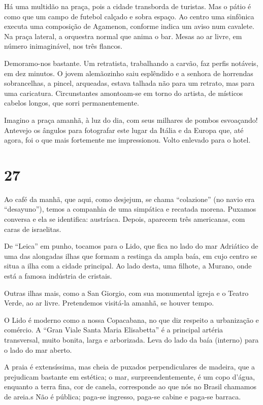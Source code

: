 Há uma multidão na praça, pois a cidade transborda de turistas. Mas o pátio é como que um campo de futebol calçado e sobra espaço. Ao centro uma sinfônica executa uma composição de Agamenon, conforme indica um aviso num cavalete. Na praça lateral, a orquestra normal que anima o bar. Mesas ao ar livre, em número inimaginável, nos três flancos.

Demoramo-nos bastante. Um retratista, trabalhando a carvão, faz perfis notáveis, em dez minutos. O jovem alemãozinho saiu esplêndido e a senhora de horrendas sobrancelhas, a pincel, arqueadas, estava talhada não para um retrato, mas para uma caricatura. Circunstantes amontoam-se em torno do artista, de místicos cabelos longos, que sorri permanentemente.

Imagino a praça amanhã, à luz do dia, com seus milhares de pombos esvoaçando! Antevejo os ângulos para fotografar este lugar da Itália e da Europa que, até agora, foi o que mais fortemente me impressionou. Volto enlevado para o hotel.

\section*{27 \adfflatleafright {}}
Ao café da manhã, que aqui, como desjejum, se chama ``colazione'' (no navio era ``desayuno''), temos a companhia de uma simpática e recatada morena. Puxamos conversa e ela se identifica: austríaca. Depois, aparecem três americanas, com caras de israelitas.

De ``Leica'' em punho, tocamos para o Lido, que fica no lado do mar Adriático de uma das alongadas ilhas que formam a restinga da ampla baía, em cujo centro se situa a ilha com a cidade principal. Ao lado desta, uma filhote, a Murano, onde está a famosa indústria de cristais.

Outras ilhas mais, como a San Giorgio, com sua monumental igreja e o Teatro Verde, ao ar livre. Pretendemos visitá-la amanhã, se houver tempo.

O Lido é moderno como a nossa Copacabana, no que diz respeito a urbanização e comércio. A ``Gran Viale Santa Maria Elisabetta'' é a principal artéria transversal, muito bonita, larga e arborizada. Leva do lado da baía (interno) para o lado do mar aberto.

A praia é extensíssima, mas cheia de puxados perpendiculares de madeira, que a prejudicam bastante em estética; o mar, surpreendentemente, é um copo d’água, enquanto a terra fina, cor de canela, corresponde ao que nós no Brasil chamamos de areia.s Não é pública; paga-se ingresso, paga-se cabine e paga-se barraca.

